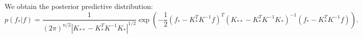 \documentclass{article}
\begin{document}
\noindent
We obtain the posterior predictive distribution:
\begin{equation}\label{eq: 1}
p(f_* | f) = \frac{1}{(2\pi)^{n/2} |K_{**} - K_*^T K^{-1} K_*|^{1/2}} 
\exp \left( 
-\frac{1}{2} 
(f_* - K_*^T K^{-1} f)^T 
(K_{**} - K_*^T K^{-1} K_*)^{-1} 
(f_* - K_*^T K^{-1} f) 
\right).
\end{equation}



% 
% 
 
\end{document}
